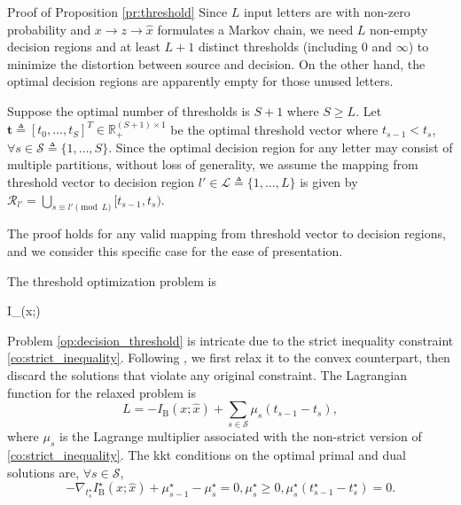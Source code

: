 \documentclass[journal]{IEEEtran}
\begin{document}
\begin{appendix}
	\begin{subsection}{Proof of Proposition \ref{pr:threshold}}
		Since $L$ input letters are with non-zero probability and $x \to z \to \hat{x}$ formulates a Markov chain, we need $L$ non-empty decision regions and at least $L+1$ distinct thresholds (including \num{0} and $\infty$) to minimize the distortion between source and decision.
		On the other hand, the optimal decision regions are apparently empty for those unused letters.

		Suppose the optimal number of thresholds is $S+1$ where $S \ge L$.
		Let $\boldsymbol{t} \triangleq [t_0,\ldots,t_S]^T \in \mathbb{R}_{+}^{(S+1) \times 1}$ be the optimal threshold vector where $t_{s-1} < t_s$, $\forall s \in \mathcal{S} \triangleq \{1,\ldots,S\}$.
		Since the optimal decision region for any letter may consist of multiple partitions, without loss of generality, we assume the mapping from threshold vector to decision region $l' \in \mathcal{L} \triangleq \{1,\ldots,L\}$ is given by $\mathcal{R}_{l'} = \bigcup_{s \equiv l' \pmod L} [t_{s-1},t_s)$.
		\begin{footnote}
			The proof holds for any valid mapping from threshold vector to decision regions, and we consider this specific case for the ease of presentation.
		\end{footnote}
		The threshold optimization problem is
		\begin{maxi!}
			{}{I_{}(x;)}{\label{op:decision_threshold}}{\label{ob:backscatter_mutual_information}}
		\end{maxi!}

		Problem \eqref{op:decision_threshold} is intricate due to the strict inequality constraint \eqref{co:strict_inequality}.
		Following \cite{Nguyen2020}, we first relax it to the convex counterpart, then discard the solutions that violate any original constraint.
		The Lagrangian function for the relaxed problem is
		\begin{equation}
			L = - I_{\mathrm{B}}(x;\hat{x}) + \sum_{s \in \mathcal{S}} \mu_s (t_{s-1} - t_s),
		\end{equation}
		where $\mu_s$ is the Lagrange multiplier associated with the non-strict version of \eqref{co:strict_inequality}.
		The \gls{kkt} conditions on the optimal primal and dual solutions are, $\forall s \in \mathcal{S}$,
		\begin{subequations}
			\label{eq:kkt_thresholding}
			\begin{equation}
				- \nabla_{t_s^\star} I^\star_{\mathrm{B}}(x;\hat{x}) + \mu_{s-1}^\star - \mu_s^\star = 0,
				\label{eq:stationarity}
			\end{equation}
			\begin{equation}
				\mu_s^\star \ge 0,
				\label{eq:dual_feasibility}
			\end{equation}
			\begin{equation}
				\mu_s^\star (t_{s-1}^\star - t_s^\star) = 0.
				\label{eq:complementary_slackness}
			\end{equation}


\end{subequations}
\end{subsection}
\end{appendix}
\end{document}
